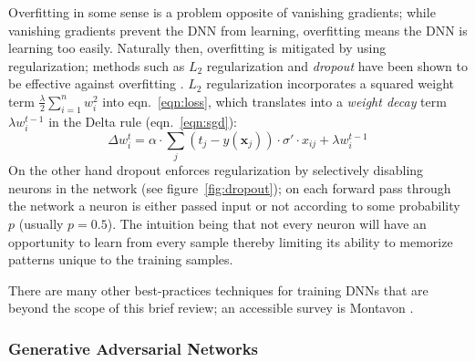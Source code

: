 Overfitting in some sense is a problem opposite of vanishing gradients; while vanishing gradients prevent the DNN from learning, overfitting means the DNN is learning too easily.
%
Naturally then, overfitting is mitigated by using regularization; methods such as \(L_2\) regularization and \textit{dropout} have been shown to be effective against overfitting \cite{bengio2013}.
%
\(L_2\) regularization incorporates a squared weight term \(\frac{\lambda}{2}\sum_{i=1}^n w_i^2\) into eqn.~\eqref{eqn:loss}, which translates into a \textit{weight decay} term \(\lambda w_i^{t-1}\) in the Delta rule (eqn.~\eqref{eqn:sgd}):
\begin{equation}
    \Delta w_i^t = \alpha \cdot \sum_j (t_j-y(\mathbf{x}_j))\cdot \sigma'\cdot x_{ij} + \lambda w_i^{t-1}
    \label{eqn:weightdecaydelta}
\end{equation}
On the other hand dropout enforces regularization by selectively disabling neurons in the network (see figure~\ref{fig:dropout}); on each forward pass through the network a neuron is either passed input or not according to some probability \(p\) (usually \(p = 0.5\)).
%
The intuition being that not every neuron will have an opportunity to learn from every sample thereby limiting its ability to memorize patterns unique to the training samples.

There are many other best-practices techniques for training DNNs that are beyond the scope of this brief review; an accessible survey is Montavon \etal \cite{montavon2012neural}.




\subsubsection{Generative Adversarial Networks}\label{subsubsec:gan}




